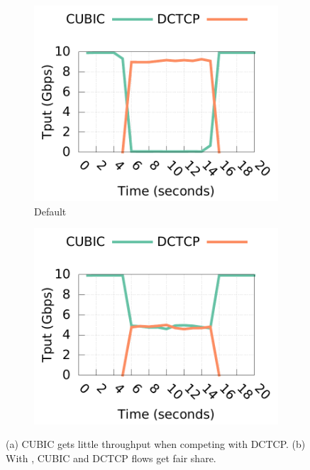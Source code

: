 \begin{figure}[th]
        \centering
        \begin{subfigure}[b]{0.225\textwidth}
                \centering
                \includegraphics[width=\textwidth]{figures/micro2flows/coexitence/cubic_dctcp_coexistence_official.pdf}
                \caption{Default}
                \label{coexistence_tput_ovs}
        \end{subfigure}
        \begin{subfigure}[b]{0.225\textwidth}
                \centering
                \includegraphics[width=\textwidth]{figures/micro2flows/coexitence/cubic_dctcp_coexistence_acdctcp.pdf}
                \caption{\acdc{}}
                \label{coexistence_tput_ovsdctcp}
        \end{subfigure}
        \caption{(a) CUBIC gets little throughput when competing with DCTCP.
		 (b) With \acdc{}, CUBIC and DCTCP flows get fair share.}
        \label{coexistence_tput}
\end{figure}



